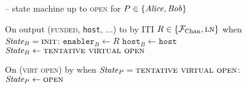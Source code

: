 \begin{figure}[H]
\begin{systembox}{\fchan{} -- state machine up to \textsc{open} for $P \in
  \{\mathit{Alice}, \mathit{Bob}\}$}
\begin{algorithmic}[1]
      \State On output (\textsc{funded}, \texttt{host}, $\dots$) to \bob by ITI
      $R \in \{\mathcal{F}_{\mathrm{Chan}}, \textsc{ln}\}$ when $\itistate_B = \textsc{init}$:
      \Indent
        \State $\texttt{enabler}_B \gets R$
        \State $\texttt{host}_B \gets \texttt{host}$
        \State $\itistate_B \gets \textsc{tentative virtual open}$
      \EndIndent
      \Statex

      \State On (\textsc{virt open}) by \adversary when $\itistate_P =
      \textsc{tentative virtual open}$:
      \Indent
        \State $\itistate_P \gets \textsc{open}$
      \EndIndent
    \end{algorithmic}
  \end{systembox}
  \caption{}
  \label{code:functionality:open}
\end{figure}

